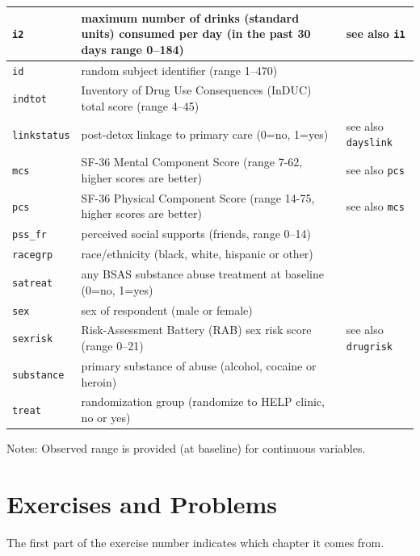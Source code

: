 \documentclass{tufte-book}\usepackage[]{graphicx}\usepackage[]{xcolor}
\renewcommand{\variable}[1]{{\color{black}\texttt{#1}}}
\begin{document}
\begin{longtable}{|p{2.1cm}|p{6.8cm}|p{3.5cm}|}
\variable{i2} & maximum number of drinks (standard units) consumed per day (in the past 30 days range 0--184) & see also \variable{i1}
\\ \hline
\variable{id} & random subject identifier (range 1--470) &
\\ \hline
\variable{indtot} & Inventory of Drug Use Consequences (InDUC) total score  (range 4--45)  &
\\ \hline
\variable{linkstatus} & post-detox linkage to primary care (0=no, 1=yes)  & see also \variable{dayslink}
\\ \hline
\variable{mcs} & SF-36 Mental Component Score  (range 7-62, higher scores are better)  & see also \variable{pcs}
\\ \hline
\variable{pcs} & SF-36 Physical Component Score  (range 14-75, higher scores are better)  & see also \variable{mcs}
\\ \hline
\variable{pss\_fr} & perceived social supports (friends, range 0--14) & 
\\ \hline
\variable{racegrp} & race/ethnicity (black, white, hispanic or other)  &  \\ \hline
\variable{satreat} & any BSAS substance abuse treatment at baseline (0=no, 1=yes)  &  \\ \hline
\variable{sex} & sex of respondent  (male or female)  & \\ \hline
\variable{sexrisk} & Risk-Assessment Battery (RAB) sex risk score  (range 0--21)  & see also \variable{drugrisk}
\\ \hline
\variable{substance} & primary substance of abuse (alcohol, cocaine or heroin) &
\\ \hline
\variable{treat} & randomization group (randomize to HELP clinic, no or yes) & 
\\ \hline
\end{longtable}
\noindent
Notes: Observed range is provided (at baseline) for continuous variables.



\chapter{Exercises and Problems}

The first part of the exercise number indicates which chapter it comes from.

\shipoutProblems






\printindex
\end{document}

